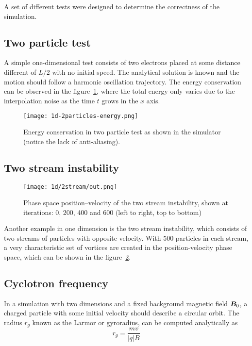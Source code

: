 A set of different tests were designed to determine the correctness of the
simulation.

\subsection{Two particle test}

A simple one-dimensional test consists of two electrons placed at some distance 
different of $L/2$ with no initial speed. The analytical solution is known and 
the motion should follow a harmonic oscillation trajectory. The energy 
conservation can be observed in the figure~\ref{fig:1d-2particles-energy}, where 
the total energy only varies due to the interpolation noise as the time $t$ 
grows in the $x$ axis.
%
\begin{figure}[h]
	\centering
	\texttt{[image: 1d-2particles-energy.png]}
	\caption{Energy conservation in two particle test as shown in the simulator 
	(notice the lack of anti-aliasing).}
	\label{fig:1d-2particles-energy}
\end{figure}

\subsection{Two stream instability}

%
\begin{figure}[ht]
	\centering
	\texttt{[image: 1d/2stream/out.png]}
	\caption{Phase space position--velocity of the two stream instability, shown 
	at iterations: 0, 200, 400 and 600 (left to right, top to bottom)}
	\label{fig:1d-2stream}
\end{figure}

Another example in one dimension is the two stream instability, which consists 
of two streams of particles with opposite velocity. With 500 particles in each 
stream, a very characteristic set of vortices are created in the 
position-velocity phase space, which can be shown in the 
figure~\ref{fig:1d-2stream}.

\subsection{Cyclotron frequency}

In a simulation with two dimensions and a fixed background magnetic field 
$\bm{B}_0$, a charged particle with some initial velocity should describe a circular 
orbit. The radius $r_g$ known as the Larmor or gyroradius, can be computed 
analytically as
\begin{equation}
r_g = \frac{m v}{|q| B}
\end{equation}
